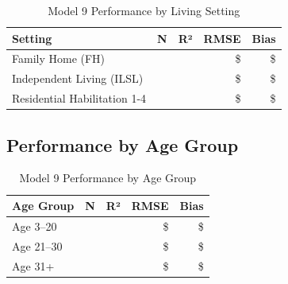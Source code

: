 \begin{table}[h]
\centering
\caption{Model 9 Performance by Living Setting}
\begin{tabular}{lrrrr}
\toprule
\textbf{Setting} & \textbf{N} & \textbf{R²} & \textbf{RMSE} & \textbf{Bias} \\
\midrule
Family Home (FH) & \ModelNineSubgrouplivingFHN{} & \ModelNineSubgrouplivingFHRSquared{} & \$\ModelNineSubgrouplivingFHRMSE{} & \$\ModelNineSubgrouplivingFHBias{} \\
Independent Living (ILSL) & \ModelNineSubgrouplivingILSLN{} & \ModelNineSubgrouplivingILSLRSquared{} & \$\ModelNineSubgrouplivingILSLRMSE{} & \$\ModelNineSubgrouplivingILSLBias{} \\
Residential Habilitation 1-4 & \ModelNineSubgrouplivingRHOneToFourN{} & \ModelNineSubgrouplivingRHOneToFourRSquared{} & \$\ModelNineSubgrouplivingRHOneToFourRMSE{} & \$\ModelNineSubgrouplivingRHOneToFourBias{} \\
\bottomrule
\end{tabular}
\label{tab:model9_by_living}
\end{table}

\subsection{Performance by Age Group}

\begin{table}[h]
\centering
\caption{Model 9 Performance by Age Group}
\begin{tabular}{lrrrr}
\toprule
\textbf{Age Group} & \textbf{N} & \textbf{R²} & \textbf{RMSE} & \textbf{Bias} \\
\midrule
Age 3--20 & \ModelNineSubgroupageAgeUnderTwentyOneN{} & \ModelNineSubgroupageAgeUnderTwentyOneRSquared{} & \$\ModelNineSubgroupageAgeUnderTwentyOneRMSE{} & \$\ModelNineSubgroupageAgeUnderTwentyOneBias{} \\
Age 21--30 & \ModelNineSubgroupageAgeTwentyOneToThirtyN{} & \ModelNineSubgroupageAgeTwentyOneToThirtyRSquared{} & \$\ModelNineSubgroupageAgeTwentyOneToThirtyRMSE{} & \$\ModelNineSubgroupageAgeTwentyOneToThirtyBias{} \\
Age 31+ & \ModelNineSubgroupageAgeThirtyOnePlusN{} & \ModelNineSubgroupageAgeThirtyOnePlusRSquared{} & \$\ModelNineSubgroupageAgeThirtyOnePlusRMSE{} & \$\ModelNineSubgroupageAgeThirtyOnePlusBias{} \\
\bottomrule
\end{tabular}
\label{tab:model9_by_age}
\end{table}

